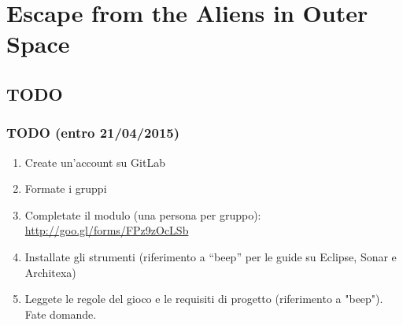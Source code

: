 \documentclass{beamer}
\begin{document}
{
%
\section{Escape from the Aliens in Outer Space}
\begin{frame}[plain]


\end{frame}
}


\subsection{TODO}
\begin{frame}
\frametitle{TODO (entro 21/04/2015)}
\begin{enumerate}
\item Create un'account su GitLab
\item Formate i gruppi
\item Completate il modulo (una persona per gruppo): \url{http://goo.gl/forms/FPz9zOcLSb}
\item Installate gli strumenti (riferimento a ``beep'' per le guide su
  Eclipse, Sonar e Architexa)
\item Leggete le regole del gioco e le requisiti di progetto
  (riferimento a "beep"). Fate domande.

\end{enumerate}
\end{frame}
\end{document}
